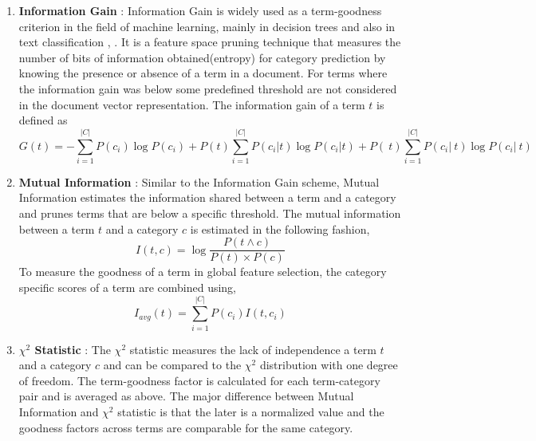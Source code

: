 \begin{enumerate}
\item{\textbf{Information Gain} : }Information Gain is widely used as a term-goodness criterion in the field of machine learning, mainly in decision trees \citep{quinlan1986induction} and also in text classification \citep{lewis1994comparison}, \citep{moulinier1996text}. It is a feature space pruning technique that measures the number of bits of information obtained(entropy) for category prediction by knowing the presence or absence of a term in a document. For terms where the information gain was below some predefined threshold are not considered in the document vector representation.  The information gain of a term $t$ is defined as
\begin{equation}
G(t) = -\sum_{i=1}^{|C|} P(c_{i})\log P(c_{i}) + P(t)\sum_{i=1}^{|C|} P(c_{i}|t)\log P(c_{i}|t) + P(~t)\sum_{i=1}^{|C|} P(c_{i}|~t)\log P(c_{i}|~t)
\end{equation}

\item{\textbf{Mutual Information} : }Similar to the Information Gain scheme, Mutual Information estimates the information shared between a term and a category and prunes terms that are below a specific threshold. The mutual information between a term $t$ and a category $c$ is estimated in the following fashion, 
\begin{equation}
I(t,c) = \log \frac{P(t \wedge c)}{P(t) \times P(c)}
\end{equation}
To measure the goodness of a term in global feature selection, the category specific scores of a term are combined using, 
\begin{equation}
I_{avg}(t) = \sum_{i=1}^{|C|} P(c_{i})I(t,c_{i})
\end{equation}

\item{\textbf{$\chi^{2}$ Statistic} : }The $\chi^{2}$ statistic measures the lack of independence a term $t$ and a category $c$ and can be compared to the $\chi^{2}$ distribution with one degree of freedom. The term-goodness factor is calculated for each term-category pair and is averaged as above. The major difference between Mutual Information and $\chi^{2}$ statistic is that the later is a normalized value and the goodness factors across terms are comparable for the same category.


\end{enumerate}
